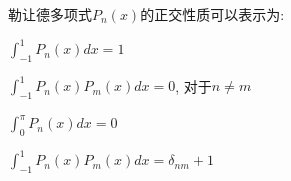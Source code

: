 \documentclass{njustexam}
\begin{document}








\begin{problem}
  勒让德多项式$P_n(x)$的正交性质可以表示为:
  \begin{abcd}
    \item $\int_{-1}^{1} P_n(x) dx = 1$

    \item $\int_{-1}^{1} P_n(x) P_m(x) dx = 0$, 对于$n \neq m$
    
    \item $\int_{0}^{\pi} P_n(x) dx = 0$
    
    \item $\int_{-1}^{1} P_n(x) P_m(x) dx = \delta_{nm} + 1$
  \end{abcd}
\end{problem}
\end{document}
